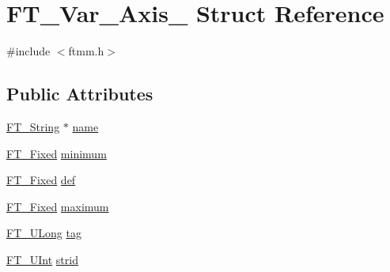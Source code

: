 \hypertarget{struct_f_t___var___axis__}{\section{F\-T\-\_\-\-Var\-\_\-\-Axis\-\_\- Struct Reference}
\label{struct_f_t___var___axis__}
}


{\ttfamily \#include $<$ftmm.\-h$>$}

\subsection*{Public Attributes}
\begin{DoxyCompactItemize}
\item 
\hyperlink{fttypes_8h_a9846214585359eb2ba6bbb0e6de30639}{F\-T\-\_\-\-String} $\ast$ \hyperlink{struct_f_t___var___axis___a8d0e0af322a692999ec3733a3e18a5a4}{name}
\item 
\hyperlink{fttypes_8h_a5f5a679cc09f758efdd0d1c5feed3c3d}{F\-T\-\_\-\-Fixed} \hyperlink{struct_f_t___var___axis___aae13a8dea1c96bc3949019e8117e7edb}{minimum}
\item 
\hyperlink{fttypes_8h_a5f5a679cc09f758efdd0d1c5feed3c3d}{F\-T\-\_\-\-Fixed} \hyperlink{struct_f_t___var___axis___a37a6ca4188a6bfd95d9d06538bf1a3dd}{def}
\item 
\hyperlink{fttypes_8h_a5f5a679cc09f758efdd0d1c5feed3c3d}{F\-T\-\_\-\-Fixed} \hyperlink{struct_f_t___var___axis___a5704641439e9f318cf3c2b73864e3260}{maximum}
\item 
\hyperlink{fttypes_8h_a4fac88bdba78eb76b505efa6e4fbf3f5}{F\-T\-\_\-\-U\-Long} \hyperlink{struct_f_t___var___axis___a01ef9396e34e740c2d2b8c7117094624}{tag}
\item 
\hyperlink{fttypes_8h_abcb8db4dbf35d2b55a9e8c7b0926dc52}{F\-T\-\_\-\-U\-Int} \hyperlink{struct_f_t___var___axis___a297d28ab0f5666e56d7575249ccc75d7}{strid}
\end{DoxyCompactItemize}


